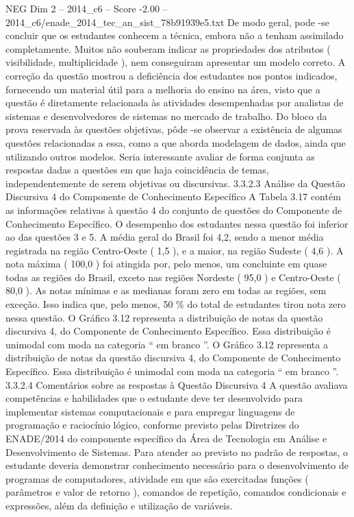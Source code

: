 \begin{textsample}{NEG Dim 2 – 2014\_c6 – Score -2.00 – 2014\_c6/enade\_2014\_tec\_an\_sist\_78b91939e5.txt}
De modo geral, pode -se concluir que os estudantes conhecem a técnica, embora não a tenham assimilado completamente.
Muitos não souberam indicar as propriedades dos atributos ( visibilidade, multiplicidade ), nem conseguiram apresentar um modelo correto.
A correção da questão mostrou a deficiência dos estudantes nos pontos indicados, fornecendo um material útil para a melhoria do ensino na área, visto que a questão é diretamente relacionada às atividades desempenhadas por analistas de sistemas e desenvolvedores de sistemas no mercado de trabalho.
Do bloco da prova reservada às questões objetivas, pôde -se observar a existência de algumas questões relacionadas a essa, como a que aborda modelagem de dados, ainda que utilizando outros modelos.
Seria interessante avaliar de forma conjunta as respostas dadas a questões em que haja coincidência de temas, independentemente de serem objetivas ou discursivas. 3.3.2.3 Análise da Questão Discursiva 4 do Componente de Conhecimento Específico A Tabela 3.17 contém as informações relativas à questão 4 do conjunto de questões do Componente de Conhecimento Específico.
O desempenho dos estudantes nessa questão foi inferior ao das questões 3 e 5.
A média geral do Brasil foi 4,2, sendo a menor média registrada na região Centro-Oeste ( 1,5 ), e a maior, na região Sudeste ( 4,6 ).
A nota máxima ( 100,0 ) foi atingida por, pelo menos, um concluinte em quase todas as regiões do Brasil, exceto nas regiões Nordeste ( 95,0 ) e Centro-Oeste ( 80,0 ).
As notas mínimas e as medianas foram zero em todas as regiões, sem exceção.
Isso indica que, pelo menos, 50 \% do total de estudantes tirou nota zero nessa questão.
O Gráfico 3.12 representa a distribuição de notas da questão discursiva 4, do Componente de Conhecimento Específico.
Essa distribuição é unimodal com moda na categoria “ em branco ”.
O Gráfico 3.12 representa a distribuição de notas da questão discursiva 4, do Componente de Conhecimento Específico.
Essa distribuição é unimodal com moda na categoria “ em branco ”. 3.3.2.4 Comentários sobre as respostas à Questão Discursiva 4 A questão avaliava competências e habilidades que o estudante deve ter desenvolvido para implementar sistemas computacionais e para empregar linguagens de programação e raciocínio lógico, conforme previsto pelas Diretrizes do ENADE/2014 do componente específico da Área de Tecnologia em Análise e Desenvolvimento de Sistemas.
Para atender ao previsto no padrão de respostas, o estudante deveria demonstrar conhecimento necessário para o desenvolvimento de programas de computadores, atividade em que são exercitadas funções ( parâmetros e valor de retorno ), comandos de repetição, comandos condicionais e expressões, além da definição e utilização de variáveis.

\end{textsample}
